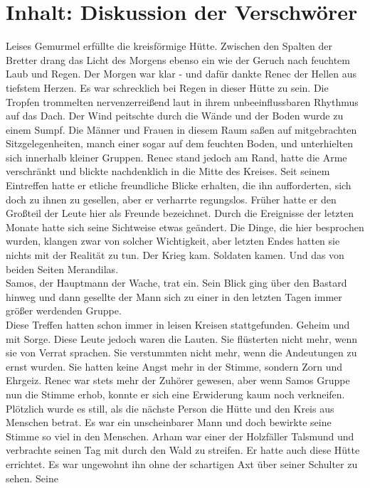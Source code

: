 \chapter{Inhalt: Diskussion der Verschwörer}

Leises Gemurmel erfüllte die kreisförmige Hütte. Zwischen den Spalten der Bretter drang das Licht 
des Morgens ebenso ein wie der Geruch nach feuchtem Laub und Regen. Der Morgen war klar - und dafür 
dankte Renec der Hellen aus tiefstem Herzen. Es war schrecklich bei Regen in dieser Hütte zu sein. 
Die Tropfen trommelten nervenzerreißend laut in ihrem unbeeinflussbaren Rhythmus auf das Dach. Der 
Wind peitschte durch die Wände und der Boden wurde zu einem Sumpf. Die Männer und Frauen in diesem 
Raum saßen auf mitgebrachten Sitzgelegenheiten, manch einer sogar auf dem feuchten Boden, und 
unterhielten sich innerhalb kleiner Gruppen. Renec stand jedoch am Rand, hatte die Arme verschränkt 
und blickte nachdenklich in die Mitte des Kreises. Seit seinem Eintreffen hatte er etliche 
freundliche Blicke erhalten, die ihn aufforderten, sich doch zu ihnen zu gesellen, aber er 
verharrte regungslos. Früher hatte er den Großteil der Leute hier als Freunde bezeichnet. Durch die 
Ereignisse der letzten Monate hatte sich seine Sichtweise etwas geändert. Die Dinge, die hier 
besprochen wurden, klangen zwar von solcher Wichtigkeit, aber letzten Endes hatten sie nichts mit 
der 
Realität zu tun. Der Krieg kam. Soldaten kamen. Und das von beiden Seiten Merandilas.\\
Samos, der Hauptmann der Wache, trat ein. Sein Blick ging über den Bastard hinweg und dann gesellte 
der Mann sich zu einer in den letzten Tagen immer größer werdenden Gruppe.\\
Diese Treffen hatten schon immer in leisen Kreisen stattgefunden. Geheim und mit Sorge. Diese Leute 
jedoch waren die Lauten. Sie flüsterten nicht mehr, wenn sie von Verrat sprachen. Sie verstummten 
nicht mehr, wenn die Andeutungen zu ernst wurden. Sie hatten keine Angst mehr in der Stimme, sondern 
Zorn und Ehrgeiz. Renec war stets mehr der Zuhörer gewesen, aber wenn Samos Gruppe nun die Stimme 
erhob, konnte er sich eine Erwiderung kaum noch verkneifen.\\
Plötzlich wurde es still, als die nächste Person die Hütte und den Kreis aus Menschen betrat. Es war 
ein unscheinbarer Mann und doch bewirkte seine Stimme so viel in den Menschen. Arham war einer der 
Holzfäller Talsmund und verbrachte seinen Tag mit durch den Wald zu streifen. Er hatte auch diese 
Hütte errichtet. Es war ungewohnt ihn ohne der schartigen Axt über seiner Schulter zu sehen. Seine 
